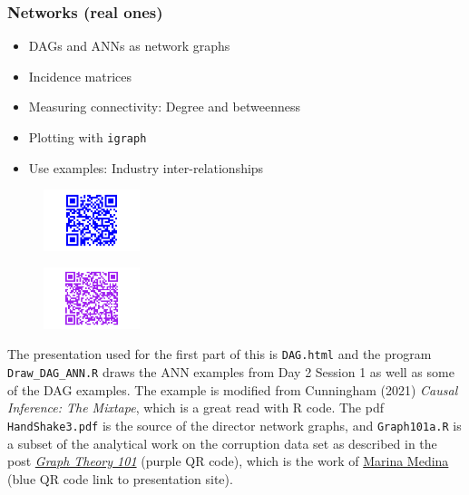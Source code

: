\documentclass[
  letterpaper,
]{book}
\providecommand{\tightlist}{%
  \setlength{\itemsep}{0pt}\setlength{\parskip}{0pt}}\usepackage{longtable,booktabs,array}
\begin{document}
\hypertarget{networks-real-ones}{%
\subsubsection{Networks (real ones)}\label{networks-real-ones}}

\begin{itemize}
\tightlist
\item
  DAGs and ANNs as network graphs
\item
  Incidence matrices
\item
  Measuring connectivity: Degree and betweenness
\item
  Plotting with \texttt{igraph}
\item
  Use examples: Industry inter-relationships
\end{itemize}

\begin{figure}

\hfill{} \includegraphics[width=0.25\textwidth,height=\textheight]{./R2021_files/figure-pdf/unnamed-chunk-3-1.pdf}

\end{figure}

\begin{figure}

\hfill{} \includegraphics[width=0.25\textwidth,height=\textheight]{./R2021_files/figure-pdf/unnamed-chunk-3-2.pdf}

\end{figure}

The presentation used for the first part of this is \texttt{DAG.html}
and the program \texttt{Draw\_DAG\_ANN.R} draws the ANN examples from
Day 2 Session 1 as well as some of the DAG examples. The example is
modified from Cunningham (2021) \emph{Causal Inference: The Mixtape},
which is a great read with R code. The pdf \texttt{HandShake3.pdf} is
the source of the director network graphs, and \texttt{Graph101a.R} is a
subset of the analytical work on the corruption data set as described in
the post
\href{https://www.r-bloggers.com/2020/01/graph-theory-101-with-corruption-cases-in-spain/}{\emph{Graph
Theory 101}} (purple QR code), which is the work of
\href{https://codingclubuc3m.rbind.io/talk/2020-01-21/}{Marina Medina}
(blue QR code link to presentation site).
\end{document}
